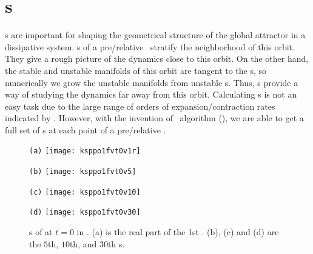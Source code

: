 \section{\Fv s}
\label{sect:ksfv}

\Fv s are important for shaping the geometrical structure of the global
attractor in a dissipative system.
\Fv s of a pre/relative \po\ stratify the
neighborhood of this orbit. They give a rough picture of the dynamics
close to this orbit. On the other hand,
the stable and unstable manifolds of this orbit are tangent to the \Fv s,
so numerically we grow the unstable manifolds from unstable \Fv s.
Thus, \Fv s provide a way of studying the dynamics far away from this
orbit.
Calculating \Fv s is not an easy task due to the
large range of orders of expansion/contraction rates indicated by
. However, with the invention of \ped\ algorithm
(), we are able to get a full set of \Fv s at each point of a
pre/relative \po.

\begin{figure}[h]
  \centering
  \begin{minipage}{.47\textwidth}
    \centering \small{\texttt{(a)}}
    \texttt{[image: ksppo1fvt0v1r]}
  \end{minipage}
  \begin{minipage}{.47\textwidth}
    \centering \small{\texttt{(b)}}
    \texttt{[image: ksppo1fvt0v5]}
  \end{minipage}
  \begin{minipage}{.47\textwidth}
    \centering \small{\texttt{(c)}}
    \texttt{[image: ksppo1fvt0v10]}
  \end{minipage}
  \begin{minipage}{.47\textwidth}
    \centering \small{\texttt{(d)}}
    \texttt{[image: ksppo1fvt0v30]}
  \end{minipage}
  \caption[\Fv s of  at $t=0$.]{
    \Fv s of  at $t=0$ in .
    (a) is the real part of the 1st \Fv.
    (b), (c) and (d) are the $5$th, $10$th, and $30$th \Fv s.
  }
  \label{fig:ksfvt0}
\end{figure}

